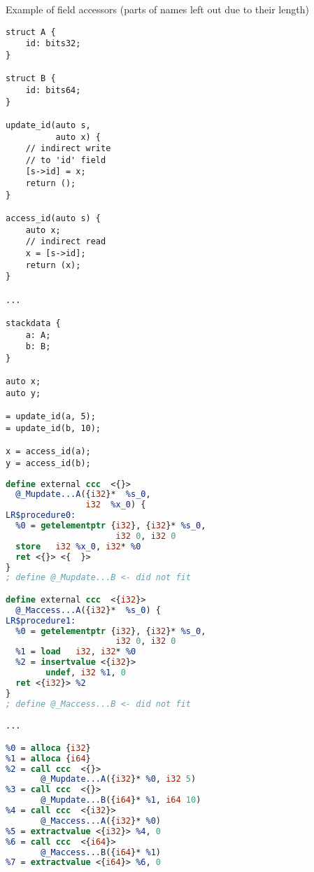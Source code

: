 \begin{listing}
    \small
    \caption{Example of field accessors (parts of names left out due to their length)}
    \label{lst:fieldAccessors}
    \begin{center}
    \begin{minipage}{0.35\linewidth}
    \begin{lstlisting}
struct A {
    id: bits32;
}

struct B {
    id: bits64;
}

update_id(auto s,
          auto x) {
    // indirect write
    // to 'id' field
    [s->id] = x;
    return ();
}

access_id(auto s) {
    auto x;
    // indirect read
    x = [s->id];
    return (x);
}

...

stackdata {
    a: A;
    b: B;
}

auto x;
auto y;

= update_id(a, 5);
= update_id(b, 10);

x = access_id(a);
y = access_id(b);
    \end{lstlisting}
    \end{minipage}%
    \begin{minipage}{0.65\linewidth}
    \begin{lstlisting}[language=LLVM]
define external ccc  <{}>
  @_Mupdate...A({i32}*  %s_0,
                i32  %x_0) {
LR$procedure0:
  %0 = getelementptr {i32}, {i32}* %s_0,
                      i32 0, i32 0
  store   i32 %x_0, i32* %0
  ret <{}> <{  }>
}
; define @_Mupdate...B <- did not fit

define external ccc  <{i32}>
  @_Maccess...A({i32}*  %s_0) {
LR$procedure1:
  %0 = getelementptr {i32}, {i32}* %s_0,
                      i32 0, i32 0
  %1 = load   i32, i32* %0
  %2 = insertvalue <{i32}>
        undef, i32 %1, 0
  ret <{i32}> %2
}
; define @_Maccess...B <- did not fit

...

%0 = alloca {i32}
%1 = alloca {i64}
%2 = call ccc  <{}>
       @_Mupdate...A({i32}* %0, i32 5)
%3 = call ccc  <{}>
       @_Mupdate...B({i64}* %1, i64 10)
%4 = call ccc  <{i32}>
       @_Maccess...A({i32}* %0)
%5 = extractvalue <{i32}> %4, 0
%6 = call ccc  <{i64}>
       @_Maccess...B({i64}* %1)
%7 = extractvalue <{i64}> %6, 0

    \end{lstlisting}
    \end{minipage}
    \end{center}
\end{listing}

